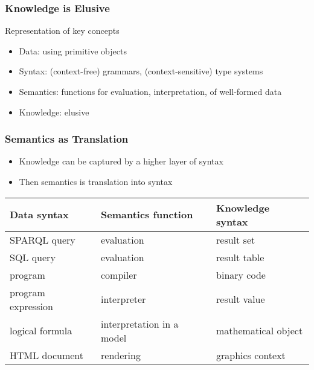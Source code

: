 \documentclass{beamer}
\begin{document}
\begin{frame}\frametitle{Knowledge is Elusive}
Representation of key concepts 
\begin{itemize}
 \item Data: using primitive objects
 \item Syntax: (context-free) grammars, (context-sensitive) type systems
 \item Semantics: functions for evaluation, interpretation, of well-formed data
 \item Knowledge: elusive
\end{itemize}
\end{frame}

\begin{frame}\frametitle{Semantics as Translation}
\begin{itemize}
\item Knowledge can be captured by a higher layer of syntax
\item Then semantics is translation into syntax
\end{itemize}

\begin{center}
\begin{tabular}{l|l|l}
Data syntax & Semantics function & Knowledge syntax \\
\hline
SPARQL query & evaluation & result set \\
SQL query & evaluation & result table \\
program & compiler & binary code \\
program expression & interpreter & result value \\ 
logical formula & interpretation in a model & mathematical object \\
HTML document & rendering & graphics context
\end{tabular}
\end{center}
\end{frame}
\end{document}
